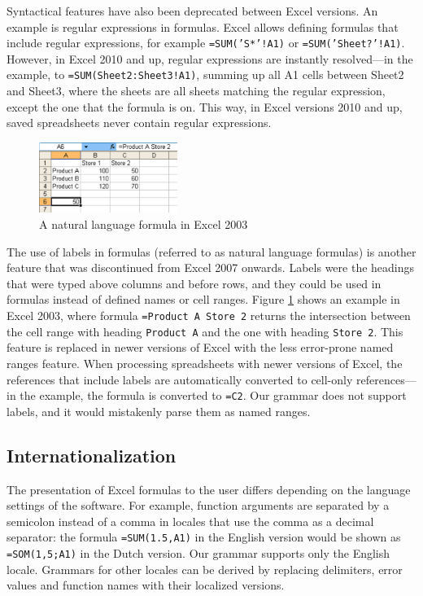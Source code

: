 \documentclass[times]{smrauth}
\begin{document}
Syntactical features have also been deprecated between Excel versions.
An example is regular expressions in formulas.
Excel allows defining formulas that include regular expressions, for example \texttt{=SUM('S*'!A1)} or \texttt{=SUM('Sheet?'!A1)}.
However, in Excel 2010 and up, regular expressions are instantly resolved---in the example, to  \texttt{=SUM(Sheet2:Sheet3!A1)}, summing up all A1 cells between Sheet2 and Sheet3, where the sheets are all sheets matching the regular expression, except the one that the formula is on.
This way, in Excel versions 2010 and up, saved spreadsheets never contain regular expressions.
\begin{figure}
	\centering
	\includegraphics[width=0.4\textwidth]{img/labels}
	\caption{A natural language formula in Excel 2003}
	\label{fig:labels}
\end{figure}

The use of labels in formulas (referred to as natural language formulas) is another feature that was discontinued from Excel 2007 onwards.
Labels were the headings that were typed above columns and before rows, and they could be used in formulas instead of defined names or cell ranges.
Figure \ref{fig:labels} shows an example in Excel 2003, where formula \texttt{=Product A Store 2} returns the intersection between the cell range with heading \texttt{Product A} and the one with heading \texttt{Store 2}.
This feature is replaced in newer versions of Excel with the less error-prone named ranges feature.
When processing spreadsheets with newer versions of Excel, the references that include labels are automatically converted to cell-only references---in the example, the formula is converted to \texttt{=C2}.
Our grammar does not support labels, and it would mistakenly parse them as named ranges.

\subsection{Internationalization}

The presentation of Excel formulas to the user differs depending on the language settings of the software. For example, function arguments are separated by a semicolon instead of a comma in locales that use the comma as a decimal separator: the formula \texttt{=SUM(1.5,A1)} in the English version would be shown as \texttt{=SOM(1,5;A1)} in the Dutch version.
Our grammar supports only the English locale.
Grammars for other locales can be derived by replacing delimiters, error values and function names with their localized versions.
\end{document}

